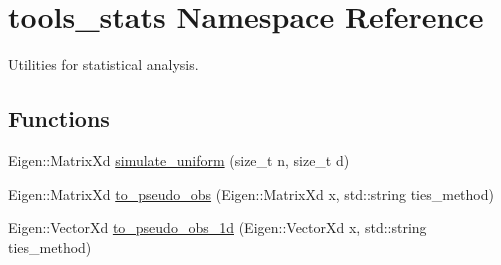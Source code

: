 \hypertarget{namespacetools__stats}{}\section{tools\+\_\+stats Namespace Reference}
\label{namespacetools__stats}


Utilities for statistical analysis.  


\subsection*{Functions}
\begin{DoxyCompactItemize}
\item 
Eigen\+::\+Matrix\+Xd \hyperlink{namespacetools__stats_a27efa963bb26b0bfc68139f0ef59fcf0}{simulate\+\_\+uniform} (size\+\_\+t n, size\+\_\+t d)
\item 
Eigen\+::\+Matrix\+Xd \hyperlink{namespacetools__stats_a88048bc643d51f30f099c33eb2f61598}{to\+\_\+pseudo\+\_\+obs} (Eigen\+::\+Matrix\+Xd x, std\+::string ties\+\_\+method)
\item 
Eigen\+::\+Vector\+Xd \hyperlink{namespacetools__stats_af09c24563535c110aea492a30eed3d3e}{to\+\_\+pseudo\+\_\+obs\+\_\+1d} (Eigen\+::\+Vector\+Xd x, std\+::string ties\+\_\+method)
\end{DoxyCompactItemize}
